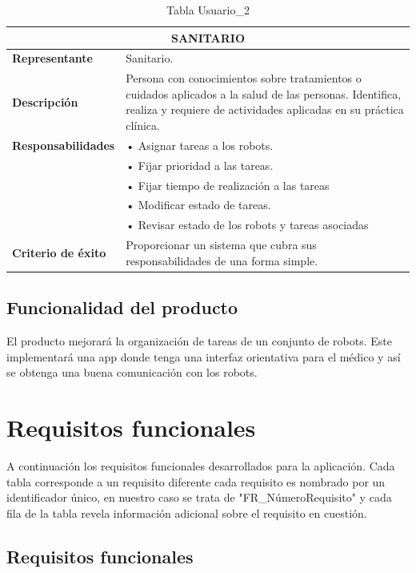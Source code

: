 \documentclass{scrreprt}
\begin{document}
\begin{table}[H]
\label{tab:my-table-user}
\begin{tabular}{|p{4cm}|p{11cm}|}
\hline
\multicolumn{2}{|c|}{\textbf{SANITARIO}} \\ \hline
\textbf{Representante}                         & Sanitario.  \\ \hline
\textbf{Descripción} &  Persona con conocimientos sobre tratamientos o cuidados aplicados a la salud de las personas. Identifica, realiza y requiere de actividades aplicadas en su práctica clínica. \\ \hline
\textbf{Responsabilidades}                         &  •	Asignar tareas a los robots. \\
 &  •	Fijar prioridad a las tareas. \\
 &  •	Fijar tiempo de realización a las tareas \\ 
 &  •	Modificar estado de tareas. \\
 &  •	Revisar estado de los robots y tareas asociadas \\
 \hline
\textbf{Criterio de éxito}                         & Proporcionar un sistema que cubra sus responsabilidades de una forma simple.  \\ \hline
\end{tabular}%

\caption{Tabla Usuario_2}
\end{table}

\section{Funcionalidad del producto}
El producto mejorará la organización de tareas de un conjunto de robots. Este implementará una app donde tenga una interfaz orientativa para el médico y así se obtenga una buena comunicación con los robots. 
\newline


\chapter{Requisitos funcionales}
A continuación los requisitos funcionales desarrollados para la aplicación. Cada tabla corresponde a un requisito diferente cada requisito es nombrado por un identificador único, en nuestro caso se trata de "FR\_NúmeroRequisito" y cada fila de la tabla revela información adicional sobre el requisito en cuestión.
\\

\section{Requisitos funcionales}
\end{document}
